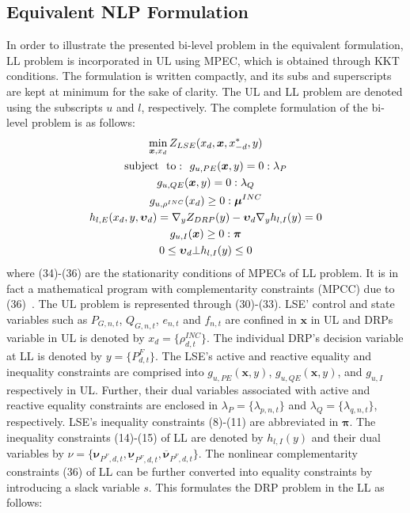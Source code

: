 \documentclass[journal]{IEEEtran}
\begin{document}
\vspace{-1mm}
\subsection{Equivalent NLP Formulation}
In order to illustrate the presented bi-level problem in the equivalent formulation, LL problem is incorporated in UL using MPEC, which is obtained through KKT conditions. The formulation is written compactly, and its subs and superscripts are kept at minimum for the sake of clarity. The UL and LL problem are denoted using the subscripts $u$ and $l$, respectively. The complete formulation of the bi-level problem is as follows: 
\begin{gather}
\mathop {\min }\limits_{{\boldsymbol{x}},{x_d}} {\rm{   }}{Z_{LSE}}({x_d},\boldsymbol{x},x_{ - d}^*,y)\\
{\rm{subject ~~to:~~}}{g_{u,PE}}(\boldsymbol{x},y) = 0{\rm{    }}:{\lambda _P}\\
{g_{u,QE}}(\boldsymbol{x},y) = 0{\rm{    }}:{\lambda _Q}\\
{g_{u,{\rho ^{INC}}}}({x_d}) \ge 0{\rm{    }}:{\boldsymbol{\mu} ^{INC}}\\
{h_{l,E}}({x_d},y,{\boldsymbol{\upsilon} _d}) = {{\nabla} _y}{Z_{DRP}}(y) - {\boldsymbol{\upsilon} _d}{{\nabla} _y}{h_{l,I}}(y) = 0\\
{g_{u,I}}(\boldsymbol{x}) \ge 0{\rm{    }}:\boldsymbol{\pi} \\
0 \le {\boldsymbol{\upsilon} _d} \bot {h_{l,I}}(y) \le 0
\end{gather}
where (34)-(36) are the stationarity conditions of MPECs of LL problem. It is in fact a mathematical program with complementarity constraints (MPCC) due to (36)~\cite{fletcher2004solving}. The UL problem is represented through (30)-(33). LSE' control and state variables such as ${P_{G,n,t}}$, ${Q_{G,n,t}}$, ${e_{n,t}}$ and ${f_{n,t}}$ are confined in $\boldsymbol{x}$ in UL and DRPs variable in UL is denoted by ${x_d} = \{ \rho _{d,t}^{INC}\} $. The individual DRP's decision variable at LL is denoted by $y = \{ P_{d,t}^F\} $. The LSE's active and reactive equality and inequality constraints are comprised into ${g_{u,PE}}(\boldsymbol{x},y)$, ${g_{u,QE}}(\boldsymbol{x},y)$, and ${g_{u,I}}$ respectively in UL. Further, their dual variables associated with active and reactive equality constraints are enclosed in ${\lambda _P} = \{ {\lambda _{p,n,t}}\}$ and ${\lambda _Q} = \{ {\lambda _{q,n,t}}\}$, respectively. LSE’s inequality constraints (8)-(11) are abbreviated in $\boldsymbol{\pi}$. The inequality constraints (14)-(15) of LL are denoted by ${h_{l,I}}(y)$ and their dual variables by $\nu  = \{ {\boldsymbol{\nu} _{{P^F},d,t}},{\underline{\boldsymbol{\nu}}  _{{P^F},d,t}},{\overline{\boldsymbol{\nu}}  _{{P^F},d,t}}\} $. The nonlinear complementarity constraints (36) of LL can be further converted into equality constraints by introducing a slack variable $s$. This formulates the DRP problem in the LL as follows:
\end{document}
